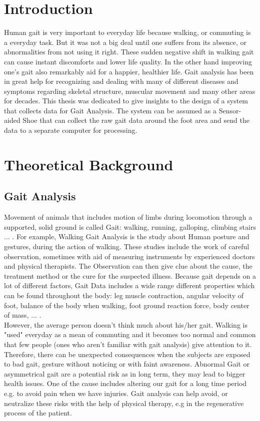 \documentclass[12 pt, a4paper]{thesis}
\begin{document}
\chapter{Introduction}
	Human gait is very important to everyday life because walking, or commuting is a everyday task. But it was not a big deal until one suffers from its absence, or abnormalities from not using it right. These sudden negative shift in walking gait can cause instant discomforts and lower life quality. In the other hand improving one's gait also remarkably aid for a happier, healthier life. Gait analysis has been in great help for recognizing and dealing with many of different diseases and symptoms regarding skeletal structure, muscular movement and many other areas for decades. This thesis was dedicated to give insights to the design of a system that collects data for Gait Analysis. The system can be assumed as a Sensor-aided Shoe that can collect the raw gait data around the foot area and send the data to a separate computer for processing.  
\chapter{Theoretical Background}
\section{Gait Analysis}
Movement of animals that includes motion of limbs during locomotion through a supported, solid ground is called Gait: walking, running, galloping, climbing stairs ... . For example, Walking Gait Analysis is the study about Human posture and gestures, during the action of walking. These studies include the work of careful observation, sometimes with aid of measuring instruments\cite{whittle} by experienced doctors and physical therapists. The Observation can then give clue about the cause, the treatment method or the cure for the suspected illness. Because gait depends on a lot of different factors, Gait Data includes a wide range different properties which can be found throughout the body: leg muscle contraction, angular velocity of foot, balance of the body when walking, foot ground reaction force, body center of mass, ... .\\
However, the average person doesn't think much about his/her gait. Walking is "used" everyday as a mean of commuting and it becomes too normal and common that few people (ones who aren't familiar with gait analysis) give attention to it. Therefore, there can be unexpected consequences when the subjects are exposed to bad gait, gesture without noticing or with faint awareness. Abnormal Gait or asymmetrical gait are a potential risk as in long term, they may lead to bigger health issues. One of the cause includes altering our gait for a long time period e.g. to avoid pain when we have injuries\cite{tekscan}. Gait analysis can help avoid, or neutralize these risks with the help of physical therapy, e.g in the regenerative process of the patient.\\
\end{document}
